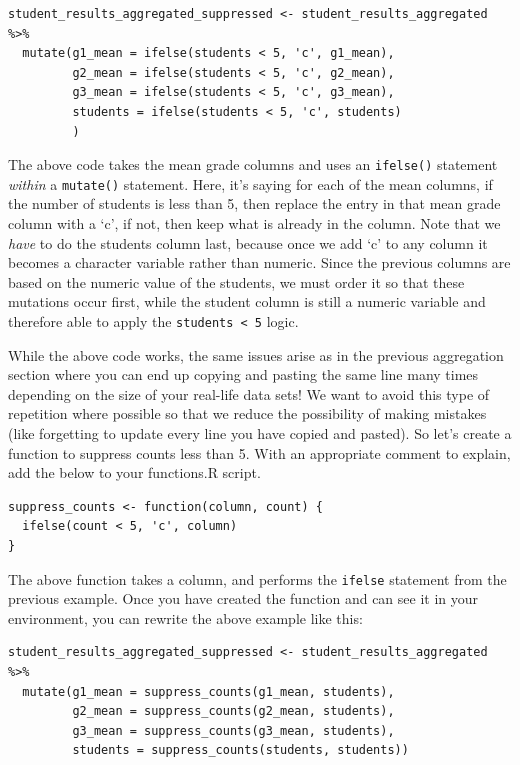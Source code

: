 \documentclass[
  12pt,
]{article}
\begin{document}
\begin{verbatim}
student_results_aggregated_suppressed <- student_results_aggregated %>%
  mutate(g1_mean = ifelse(students < 5, 'c', g1_mean),
         g2_mean = ifelse(students < 5, 'c', g2_mean),
         g3_mean = ifelse(students < 5, 'c', g3_mean),
         students = ifelse(students < 5, 'c', students)
         )
\end{verbatim}

The above code takes the mean grade columns and uses an
\texttt{ifelse()} statement \emph{within} a \texttt{mutate()} statement.
Here, it's saying for each of the mean columns, if the number of
students is less than 5, then replace the entry in that mean grade
column with a `c', if not, then keep what is already in the column. Note
that we \emph{have} to do the students column last, because once we add
`c' to any column it becomes a character variable rather than numeric.
Since the previous columns are based on the numeric value of the
students, we must order it so that these mutations occur first, while
the student column is still a numeric variable and therefore able to
apply the \texttt{students\ \textless{}\ 5} logic.

While the above code works, the same issues arise as in the previous
aggregation section where you can end up copying and pasting the same
line many times depending on the size of your real-life data sets! We
want to avoid this type of repetition where possible so that we reduce
the possibility of making mistakes (like forgetting to update every line
you have copied and pasted). So let's create a function to suppress
counts less than 5. With an appropriate comment to explain, add the
below to your functions.R script.

\begin{verbatim}
suppress_counts <- function(column, count) {
  ifelse(count < 5, 'c', column)
}
\end{verbatim}

The above function takes a column, and performs the \texttt{ifelse}
statement from the previous example. Once you have created the function
and can see it in your environment, you can rewrite the above example
like this:

\begin{verbatim}
student_results_aggregated_suppressed <- student_results_aggregated %>%
  mutate(g1_mean = suppress_counts(g1_mean, students),
         g2_mean = suppress_counts(g2_mean, students),
         g3_mean = suppress_counts(g3_mean, students),
         students = suppress_counts(students, students))
\end{verbatim}
\end{document}
